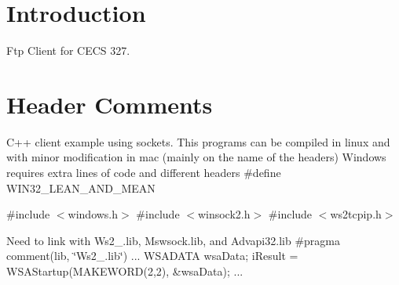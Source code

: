 \hypertarget{index_intro_sec}{}\section{Introduction}\label{index_intro_sec}
Ftp Client for C\+E\+CS 327. \hypertarget{index_sec}{}\section{Header Comments}\label{index_sec}
C++ client example using sockets. This programs can be compiled in linux and with minor modification in mac (mainly on the name of the headers) Windows requires extra lines of code and different headers \#define W\+I\+N32\+\_\+\+L\+E\+A\+N\+\_\+\+A\+N\+D\+\_\+\+M\+E\+AN

\#include $<$windows.\+h$>$ \#include $<$winsock2.\+h$>$ \#include $<$ws2tcpip.\+h$>$

Need to link with Ws2\+\_.\+lib, Mswsock.\+lib, and Advapi32.\+lib \#pragma comment(lib, \char`\"{}\+Ws2\+\_.\+lib\char`\"{}) ... W\+S\+A\+D\+A\+TA wsa\+Data; i\+Result = W\+S\+A\+Startup(\+M\+A\+K\+E\+W\+O\+R\+D(2,2), \&wsa\+Data); ... 